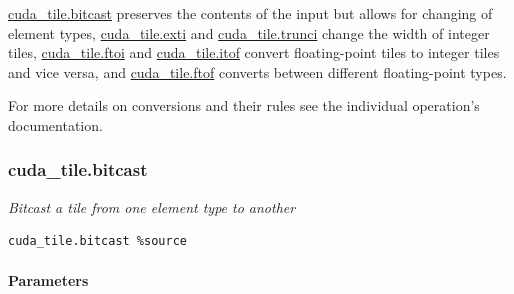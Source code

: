 \documentclass{article}
\begin{document}
\href{https://docs.nvidia.com/cuda/tile-ir/latest/sections/operations.html#op-cuda-tile-bitcast}{cuda\_tile.bitcast} preserves the contents of the input but allows for changing of element types, \href{https://docs.nvidia.com/cuda/tile-ir/latest/sections/operations.html#op-cuda-tile-exti}{cuda\_tile.exti} and \href{https://docs.nvidia.com/cuda/tile-ir/latest/sections/operations.html#op-cuda-tile-trunci}{cuda\_tile.trunci} change the width of integer tiles, \href{https://docs.nvidia.com/cuda/tile-ir/latest/sections/operations.html#op-cuda-tile-ftoi}{cuda\_tile.ftoi} and \href{https://docs.nvidia.com/cuda/tile-ir/latest/sections/operations.html#op-cuda-tile-itof}{cuda\_tile.itof} convert floating-point tiles to integer tiles and vice versa, and \href{https://docs.nvidia.com/cuda/tile-ir/latest/sections/operations.html#op-cuda-tile-ftof}{cuda\_tile.ftof} converts between different floating-point types.


For more details on conversions and their rules see the individual operation's documentation.


\subsubsection{cuda\_tile.bitcast}

\textit{Bitcast a tile from one element type to another}


\begin{lstlisting}
cuda_tile.bitcast %source
\end{lstlisting}

\paragraph{Parameters}
\end{document}
